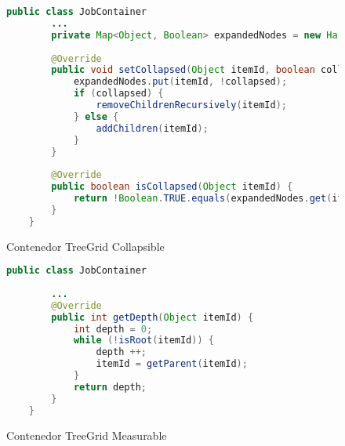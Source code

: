 \begin{figure}[!tb]
	\centering
	\begin{lstlisting}[language=Java]
	public class JobContainer
		...
		private Map<Object, Boolean> expandedNodes = new HashMap<>();
			
		@Override
		public void setCollapsed(Object itemId, boolean collapsed) {
			expandedNodes.put(itemId, !collapsed);	
			if (collapsed) {
				removeChildrenRecursively(itemId);
			} else {
				addChildren(itemId);
			}
		}
		
		@Override
		public boolean isCollapsed(Object itemId) {
			return !Boolean.TRUE.equals(expandedNodes.get(itemId));
		}
	}\end{lstlisting}
	\caption{Contenedor TreeGrid Collapsible}
	\label{fig:jobContainerCollapsible}
\end{figure}

\begin{figure}[!tb]
	\centering
	\begin{lstlisting}[language=Java]	
	public class JobContainer
	
		...
		@Override
		public int getDepth(Object itemId) {
			int depth = 0;
			while (!isRoot(itemId)) {
				depth ++;
				itemId = getParent(itemId);
			}
			return depth;
		}
	}\end{lstlisting}
	\caption{Contenedor TreeGrid Measurable}
	\label{fig:jobContainerMeasurable}
\end{figure}







